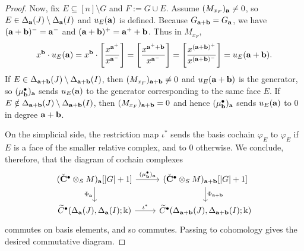 \documentclass[10pt,a4paper]{amsart}
\def\a{{\bold a}}
\def\b{{\bold b}}
\def\kk{{\Bbbk}}
\begin{document}
\begin{proof}
	Now, fix $E\subseteq[n]\setminus G$ and $F:=G\cup E$. Assume $(M_{x_F})_\a\neq 0$, so $E\in\Delta_\a(J)\setminus\Delta_\a(I)$
	and $u_E(\a)$ is defined. Because $G_{\a+\b}=G_\a$, we have $(\a+\b)^-=\a^-$ and $(\a+\b)^+=\a^++\b$.
	Thus in $M_{x_F}$,
	\[
	x^\b\cdot u_E(\a)
	=
	x^\b\cdot \left[\frac{x^{\a^+}}{x^{\a^-}}\right]
	=
	\left[\frac{x^{\a^++\b}}{x^{\a^-}}\right]
	=
	\left[\frac{x^{(\a+\b)^+}}{x^{(\a+\b)^-}}\right]
	=
	u_E(\a+\b).
	\]
	If $E\in\Delta_{\a+\b}(J)\setminus\Delta_{\a+\b}(I)$, then $(M_{x_F})_{\a+\b}\neq 0$ and $u_E(\a+\b)$ is the generator,
	so $(\mu_\b^\bullet)_\a$ sends $u_E(\a)$ to the generator corresponding to the same face $E$.
	If $E\notin\Delta_{\a+\b}(J)\setminus\Delta_{\a+\b}(I)$, then $(M_{x_F})_{\a+\b}=0$ and hence $(\mu_\b^\bullet)_\a$ sends
	$u_E(\a)$ to $0$ in degree $\a+\b$.
	
	On the simplicial side, the restriction map $\iota^\ast$ sends the basis cochain $\varphi_E$ to $\varphi_E$ if
	$E$ is a face of the smaller relative complex, and to $0$ otherwise. We conclude, therefore, that the diagram of cochain complexes
	\[
	\begin{tikzcd}
		(\Check{\bf C}^\bullet\otimes_S M)_\a[|G|+1]
		\arrow[r,"(\mu_\b^\bullet)_\a"]
		\arrow[d,"\Phi_\a"']
		&
		(\Check{\bf C}^\bullet\otimes_S M)_{\a+\b}[|G|+1]
		\arrow[d,"\Phi_{\a+\b}"]
		\\
		\widetilde C^\bullet(\Delta_\a(J),\Delta_\a(I);\kk)
		\arrow[r,"\iota^\ast"]
		&
		\widetilde C^\bullet(\Delta_{\a+\b}(J),\Delta_{\a+\b}(I);\kk)
	\end{tikzcd}
	\]
	commutes on basis elements, and so commutes.
	Passing to cohomology gives the desired commutative diagram.
\end{proof}
\end{document}
